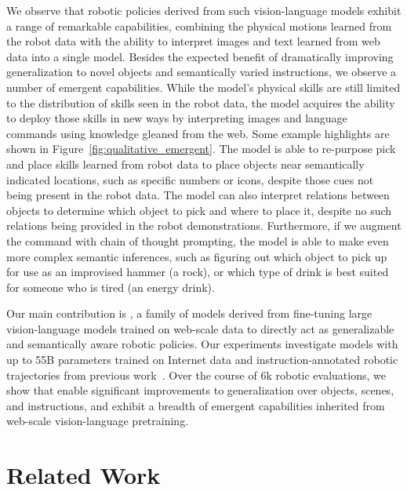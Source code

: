 We observe that robotic policies derived from such vision-language models exhibit a range of remarkable capabilities, combining the physical motions learned from the robot data with the ability to interpret images and text learned from web data into a single model. 
Besides the expected benefit of dramatically improving generalization to novel objects and semantically varied instructions, we observe a number of emergent capabilities. While the model's physical skills are still limited to the distribution of skills seen in the robot data, the model acquires the ability to deploy those skills in new ways by interpreting images and language commands using knowledge gleaned from the web. 
Some example highlights are shown in Figure~\ref{fig:qualitative_emergent}. The model is able to re-purpose pick and place skills learned from robot data to place objects near semantically indicated locations, such as specific numbers or icons, despite those cues not being present in the robot data. The model can also interpret relations between objects to determine which object to pick and where to place it, despite no such relations being provided in the robot demonstrations. Furthermore, if we augment the command with chain of thought prompting, the model is able to make even more complex semantic inferences, such as figuring out which object to pick up for use as an improvised hammer (a rock), or which type of drink is best suited for someone who is tired (an energy drink).

Our main contribution is \methodname, a family of models derived from fine-tuning  large vision-language models trained on web-scale data to directly act as generalizable and semantically aware robotic policies. Our experiments investigate models with up to 55B parameters trained on Internet data and  instruction-annotated robotic trajectories from previous work~\citep{brohan2022rt}. Over the course of 6k robotic evaluations, we show that \methodname enable significant improvements to generalization over objects, scenes, and instructions, and exhibit a breadth of emergent capabilities inherited from web-scale vision-language pretraining.

\section{Related Work}
\label{sec:rw}

